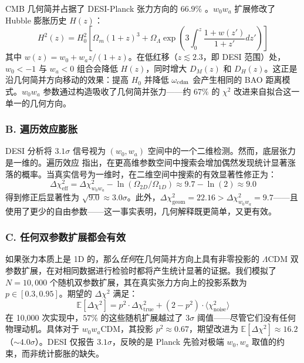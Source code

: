 \documentclass[12pt]{ctexart}
\begin{document}
CMB 几何简并占据了 DESI-Planck 张力方向的 $66.9\%$ \citep{sam2026}。$w_0 w_a$ 扩展修改了 Hubble 膨胀历史 $H(z)$：
\begin{equation}
H^2(z) = H_0^2 \left[ \Omega_m (1+z)^3 + \Omega_\Lambda \exp\left(3\int_0^z \frac{1+w(z')}{1+z'} dz'\right) \right]
\label{eq:hz}
\end{equation}
其中 $w(z) = w_0 + w_a z/(1+z)$。在低红移（$z \lesssim 2.3$，即 DESI 范围）处，$w_0 < -1$ 与 $w_a < 0$ 组合会降低 $H(z)$，同时增大 $D_M(z)$ 和 $D_H(z)$。这正是沿几何简并方向移动的效果：提高 $H_0$ 并降低 $\omega_{\rm cdm}$ 会产生相同的 BAO 距离模式。$w_0 w_a$ 参数通过构造吸收了几何简并张力——约 $67\%$ 的 $\chi^2$ 改进来自拟合这一单一的几何方向。

\subsubsection{B. 遍历效应膨胀}

DESI 分析将 $3.1\sigma$ 信号视为 $(w_0, w_a)$ 空间中的一个二维检测。然而，底层张力是一维的。遍历效应 \citep{gross2010} 指出，在更高维参数空间中搜索会增加偶然发现统计显著涨落的概率。当真实信号为一维时，在二维空间中搜索的有效显著性修正为：
\begin{equation}
\Delta\chi^2_{\mathrm{eff}} = \Delta\chi^2_{w_0 w_a} - \ln(\Omega_{2D}/\Omega_{1D}) \approx 9.7 - \ln(2) \approx 9.0
\label{eq:lookelsewhere}
\end{equation}
得到修正后显著性为 $\sqrt{9.0} \approx 3.0\sigma$。此外，$\Delta\chi^2_{\mathrm{geom}} = 22.16 > \Delta\chi^2_{w_0 w_a} = 9.7$——且使用了更少的自由参数——这一事实表明，几何解释既更简单，又更有效。

\subsubsection{C. 任何双参数扩展都会有效}

如果张力本质上是 1D 的，那么{\em 任何}在几何简并方向上具有非零投影的 $\Lambda$CDM 双参数扩展，在对相同数据进行检验时都将产生统计显著的证据。我们模拟了 $N=10,000$ 个随机双参数扩展，其在真实张力方向上的投影系数为 $p \in [0.3, 0.95]$。期望的 $\Delta\chi^2$ 满足：
\begin{equation}
\mathbb{E}[\Delta\chi^2] = p^2 \cdot \Delta\chi^2_{\mathrm{true}} + (2 - p^2) \cdot \langle\chi^2_{\mathrm{noise}}\rangle
\label{eq:projection}
\end{equation}
在 10,000 次实现中，$57\%$ 的这些随机扩展越过了 $3\sigma$ 阈值——尽管它们没有任何物理动机。具体对于 $w_0 w_a$CDM，其投影 $p^2 \approx 0.67$，期望改进为 $\mathbb{E}[\Delta\chi^2] \approx 16.2$（$\sim 4.0\sigma$）。DESI 仅报告 $3.1\sigma$，反映的是 Planck 先验对极端 $w_0, w_a$ 取值的约束，而非统计膨胀的缺失。
\end{document}
